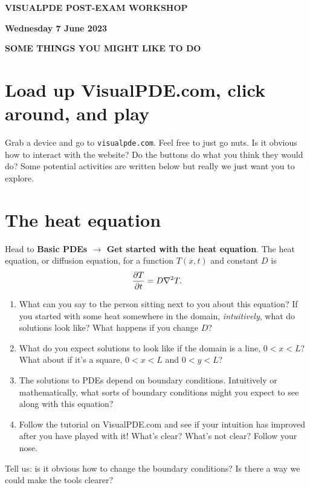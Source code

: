 \documentclass[a4paper,10pt]{article}
\begin{document}
 
%
\setlength{\parindent}{0pt}
\textbf{VISUALPDE POST-EXAM WORKSHOP}

\textbf{Wednesday 7 June 2023}
\setlength{\parskip}{3ex}

\textbf{SOME THINGS YOU MIGHT LIKE TO DO}
%
\setlength{\parskip}{2ex}

\section{Load up VisualPDE.com, click around, and play}
Grab a device and go to \texttt{visualpde.com}. Feel free to just go nuts. Is it obvious how to interact with the website? Do the buttons do what you think they would do? Some potential activities are written below but really we just want you to explore.

\section{The heat equation}
Head to \textbf{Basic PDEs $\to$ Get started with the heat equation}. The heat equation, or diffusion equation, for a function $T(x,t)$ and constant $D$ is
\[\pd{T}{t} = D \nabla^2 T.\]
\begin{enumerate}[label=(\alph*)]
    \item What can you say to the person sitting next to you about this equation? If you started with some heat somewhere in the domain, \emph{intuitively}, what do solutions look like? What happens if you change $D$?
    \item What do you expect solutions to look like if the domain is a line, $0<x<L$? What about if it's a square, $0<x<L$ and $0<y<L$?
    \item The solutions to PDEs depend on boundary conditions. Intuitively or mathematically, what sorts of boundary conditions might you expect to see along with this equation? 
	\item Follow the tutorial on VisualPDE.com and see if your intuition has improved after you have played with it! What's clear? What's not clear? Follow your nose.
\end{enumerate}
Tell us: is it obvious how to change the boundary conditions? Is there a way we could make the tools clearer?
\end{document}
